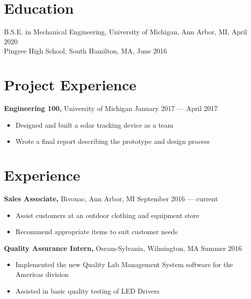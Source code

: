 \documentclass[margin]{res}
\begin{document}

\address{{\bf Present Address} \\ 1021 Vaughn St \\ The Dean Apt 1 \\ Ann Arbor, MI 48104  \\ (978) 873-7207 }
\address{{\bf Permanent Address} \\ 1499 Salem Street \\ North Andover, MA 01845 \\ (978) 725-4887 }


\begin{resume}

	\section{Education}
	B.S.E. in Mechanical Engineering, University of Michigan, Ann Arbor, MI, April 2020 \\
	Pingree High School, South Hamilton, MA, June 2016

  \section{Project Experience}
  {\bf Engineering 100,} University of Michigan \hfill January 2017 --- April 2017
  \begin{itemize} \itemsep -2pt
    \item Designed and built a solar tracking device as a team
    \item Wrote a final report describing the prototype and design process
  \end{itemize}

	\section{Experience}
	{\bf Sales Associate,} Bivouac, Ann Arbor, MI \hfill September 2016 --- current
	\begin{itemize} \itemsep -2pt
		\item Assist customers at an outdoor clothing and equipment store
		\item Recommend appropriate items to suit customer needs
	\end{itemize}

	{\bf Quality Assurance Intern,} Osram-Sylvania, Wilmington, MA \hfill Summer 2016
	\begin{itemize} \itemsep -2pt
		\item Implemented the new Quality Lab Management System software for the Americas division
		\item Assisted in basic quality testing of LED Drivers
	\end{itemize}


\end{resume}
\end{document}

